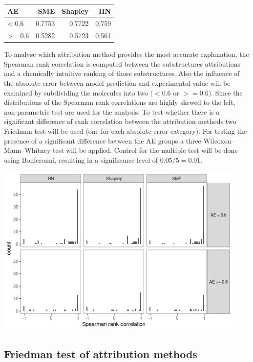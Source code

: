 \documentclass[
  12pt,
  a4paper]{article}
\author{}
\date{\vspace{-2.5em}}
\begin{document}
\begin{longtable}[]{@{}lrrr@{}}
\toprule\noalign{}
AE & SME & Shapley & HN \\
\midrule\noalign{}
\endhead
\bottomrule\noalign{}
\endlastfoot
\textless{} 0.6 & 0.7753 & 0.7722 & 0.759 \\
\textgreater= 0.6 & 0.5282 & 0.5723 & 0.561 \\
\end{longtable}

To analyse which attribution method provides the most accurate
explanation, the Spearman rank correlation is computed between the
substructures attributions and a chemically intuitive ranking of those
substructures. Also the influence of the absolute error between model
prediction and experimental value will be examined by subdividing the
molecules into two \((<0.6\) or \(>=0.6)\). Since the distributions of
the Spearman rank correlations are highly skewed to the left,
non-parametric test are used for the analysis. To test whether there is
a significant difference of rank correlation between the attribution
methods two Friedman test will be used (one for each absolute error
category). For testing the presence of a significant difference between
the AE groups a three Wilcoxon--Mann--Whitney test will be applied.
Control for the multiple test will be done using Bonferonni, resulting
in a significance level of \(0.05/5 = 0.01\).

\includegraphics{statistical_test_files/figure-latex/distributions-1.png}

\newpage

\hypertarget{friedman-test-of-attribution-methods}{%
\subsection{Friedman test of attribution
methods}\label{friedman-test-of-attribution-methods}}
\end{document}
